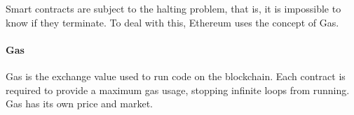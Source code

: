 Smart contracts are subject to the halting problem,
that is, it is impossible to know if they terminate.
To deal with this, Ethereum uses the concept of Gas.

\paragraph{Gas}
Gas is the exchange value used to run code on the blockchain.
Each contract is required to provide a maximum gas usage,
stopping infinite loops from running.
Gas has its own price and market.
